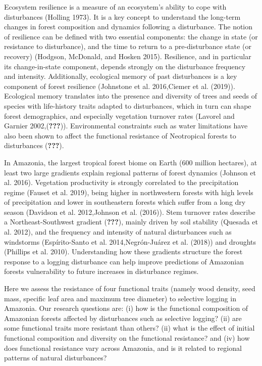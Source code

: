 \documentclass[]{elsarticle} %
\begin{document}
Ecosystem resilience is a measure of an ecosystem's ability to cope with
disturbances (Holling 1973). It is a key concept to understand the
long-term changes in forest composition and dynamics following a
disturbance. The notion of resilience can be defined with two essential
components: the change in state (or resistance to disturbance), and the
time to return to a pre-disturbance state (or recovery) (Hodgson,
McDonald, and Hosken 2015). Resilience, and in particular its
change-in-state component, depends strongly on the disturbance frequency
and intensity. Additionally, ecological memory of past disturbances is a
key component of forest resilience (Johnstone et al. 2016,Ciemer et al.
(2019)). Ecological memory translates into the presence and diversity of
trees and seeds of species with life-history traits adapted to
disturbances, which in turn can shape forest demographics, and
especially vegetation turnover rates (Lavorel and Garnier
2002,({\textbf{???}})). Environmental constraints such as water
limitations have also been shown to affect the functional resistance of
Neotropical forests to disturbances ({\textbf{???}}).

In Amazonia, the largest tropical forest biome on Earth (600 million
hectares), at least two large gradients explain regional patterns of
forest dynamics (Johnson et al. 2016). Vegetation productivity is
strongly correlated to the precipitation regime (Fauset et al. 2019),
being higher in northwestern forests with high levels of precipitation
and lower in southeastern forests which suffer from a long dry season
(Davidson et al. 2012,Johnson et al. (2016)). Stem turnover rates
describe a Northeast-Southwest gradient ({\textbf{???}}), mainly driven
by soil stability (Quesada et al. 2012), and the frequency and intensity
of natural disturbances such as windstorms (Espírito-Santo et al.
2014,Negrón-Juárez et al. (2018)) and droughts (Phillips et al. 2010).
Understanding how these gradients structure the forest response to a
logging disturbance can help improve predictions of Amazonian forests
vulnerability to future increases in disturbance regimes.

Here we assess the resistance of four functional traits (namely wood
density, seed mass, specific leaf area and maximum tree diameter) to
selective logging in Amazonia. Our research questions are: (i) how is
the functional composition of Amazonian forests affected by disturbances
such as selective logging? (ii) are some functional traits more
resistant than others? (ii) what is the effect of initial functional
composition and diversity on the functional resistance? and (iv) how
does functional resistance vary across Amazonia, and is it related to
regional patterns of natural disturbances?
\end{document}
